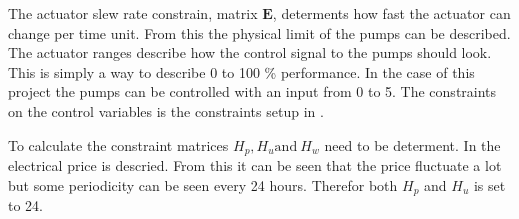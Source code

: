 The actuator slew rate constrain, matrix $\pmb{E}$, determents how fast the actuator can change per time unit. From this the physical limit of the pumps can be described. The actuator ranges describe how the control signal to the pumps should look. This is simply a way to describe 0 to 100 \% performance. In the case of this project the pumps can be controlled with an input from 0 to 5. The constraints on the control variables is the constraints setup in . 



To calculate the constraint matrices $H_p, H_u \text{and} \: H_w$ need to be determent. In  the electrical price is descried. From this it can be seen that the price fluctuate a lot but some periodicity can be seen every 24 hours. Therefor both $H_p$ and $ H_u $ is set to 24. 






